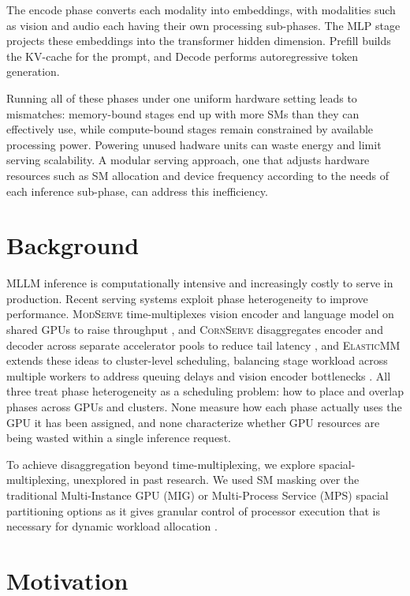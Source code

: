 \documentclass[10pt,twocolumn]{article}
\begin{document}
The encode phase converts each modality into embeddings, with modalities such as vision and audio each having their own processing sub-phases. The MLP stage projects these embeddings into the transformer hidden dimension. Prefill builds the KV-cache for the prompt, and Decode performs autoregressive token generation.

Running all of these phases under one uniform hardware setting leads to mismatches: memory-bound stages end up with more SMs than they can effectively use, while compute-bound stages remain constrained by available processing power. Powering unused hadware units can waste energy and limit serving scalability. A modular serving approach, one that adjusts hardware resources such as SM allocation and device frequency according to the needs of each inference sub-phase, can address this inefficiency.

\section{Background}

MLLM inference is computationally intensive and increasingly costly to serve in production. Recent serving systems exploit phase heterogeneity to improve performance. \textsc{ModServe} time-multiplexes vision encoder and language model on shared GPUs to raise throughput \cite{modserve2025}, and \textsc{CornServe} disaggregates encoder and decoder across separate accelerator pools to reduce tail latency \cite{cornserve2025}, and \textsc{ElasticMM} extends these ideas to cluster-level scheduling, balancing stage workload across multiple workers to address queuing delays and vision encoder bottlenecks \cite{elasticmm2025}. All three treat phase heterogeneity as a scheduling problem: how to place and overlap phases across GPUs and clusters. None measure how each phase actually uses the GPU it has been assigned, and none characterize whether GPU resources are being wasted within a single inference request. 

To achieve disaggregation beyond time-multiplexing, we explore spacial-multiplexing, unexplored in past research. We used SM masking over the traditional Multi-Instance GPU (MIG) or Multi-Process Service (MPS) spacial partitioning options as it gives granular control of processor execution that is necessary for dynamic workload allocation \cite{libsmctrl2023}. 

\section{Motivation}
\label{sec:Motivation}
\end{document}
